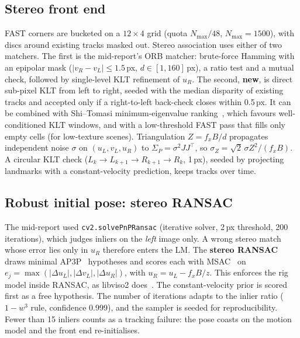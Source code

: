 \documentclass[11pt,a4paper]{article}
\begin{document}
\subsection{Stereo front end}\label{sec:frontend}
FAST corners are bucketed on a $12{\times}4$ grid (quota $N_{\max}/48$, $N_{\max} = 1500$), with discs around existing tracks masked out. Stereo association uses either of two matchers. The first is the mid-report's ORB matcher: brute-force Hamming with an epipolar mask ($|v_R - v_L| \le 1.5$\,px, $d\in[1, 160]$\,px), a ratio test and a mutual check, followed by single-level KLT refinement of $u_R$. The second, \textbf{new}, is direct sub-pixel KLT from left to right, seeded with the median disparity of existing tracks and accepted only if a right-to-left back-check closes within 0.5\,px. It can be combined with Shi--Tomasi minimum-eigenvalue ranking~\cite{shi_tomasi}, which favours well-conditioned KLT windows, and with a low-threshold FAST pass that fills only empty cells (for low-texture scenes). Triangulation $Z = f_xB/d$ propagates independent noise $\sigma$ on $(u_L, v_L, u_R)$ to $\Sigma_P = \sigma^2 JJ^\top$, so $\sigma_Z = \sqrt2\,\sigma Z^2/(f_xB)$. A circular KLT check ($L_k\!\to\!L_{k+1}\!\to\!R_{k+1}\!\to\!R_k$, 1\,px), seeded by projecting landmarks with a constant-velocity prediction, keeps tracks over time.

\subsection{Robust initial pose: stereo RANSAC}\label{sec:ransac}
The mid-report used \texttt{cv2.solvePnPRansac} (iterative solver, 2\,px threshold, 200 iterations), which judges inliers on the \emph{left} image only. A wrong stereo match whose error lies only in $u_R$ therefore enters the LM. The \textbf{stereo RANSAC} draws minimal AP3P~\cite{ap3p} hypotheses and scores each with MSAC~\cite{msac} on $e_j = \max(|\Delta u_L|, |\Delta v_L|, |\Delta u_R|)$, with $u_R = u_L - f_xB/z$. This enforces the rig model inside RANSAC, as libviso2 does~\cite{stereoscan}. The constant-velocity prior is scored first as a free hypothesis. The number of iterations adapts to the inlier ratio ($1 - w^3$ rule, confidence 0.999), and the sampler is seeded for reproducibility. Fewer than 15 inliers counts as a tracking failure: the pose coasts on the motion model and the front end re-initialises.
\end{document}
